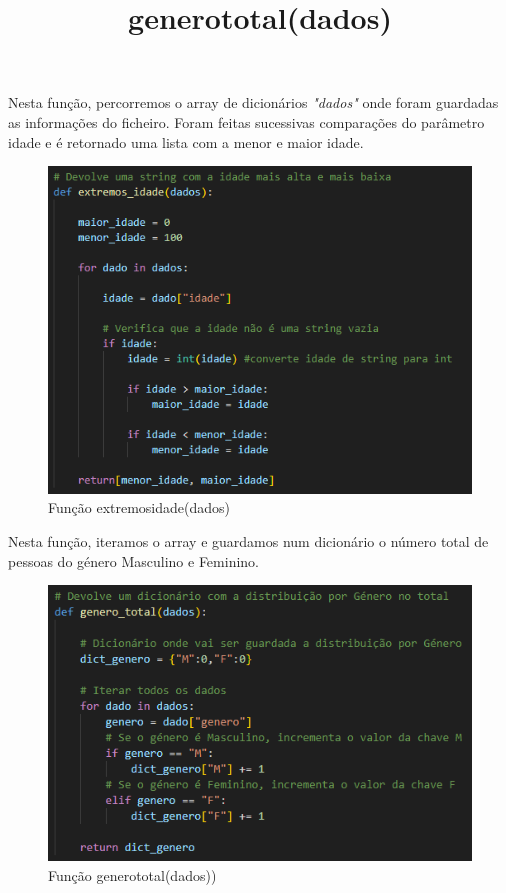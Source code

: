 \documentclass[11pt,a4paper]{report}%
\begin{document}
Nesta função, percorremos o array de dicionários \textit{"dados"} onde foram guardadas as informações do ficheiro. Foram feitas sucessivas comparações do parâmetro idade e é retornado uma lista com a menor e maior idade.


\begin{figure}[htbp]
\centerline{\includegraphics{extremos_idade.png}}
\caption{Função extremos\textunderscore idade(dados)}
\label{fig}
\end{figure}  

\newpage
\title{\textbf{genero\textunderscore total(dados)}}

Nesta função, iteramos o array e guardamos num dicionário o número total de pessoas do género Masculino e Feminino.\\

\begin{figure}[htbp]
\centerline{\includegraphics{genero_total.png}}
\caption{Função genero\textunderscore total(dados))}
\label{fig}
\end{figure}  
\end{document}
